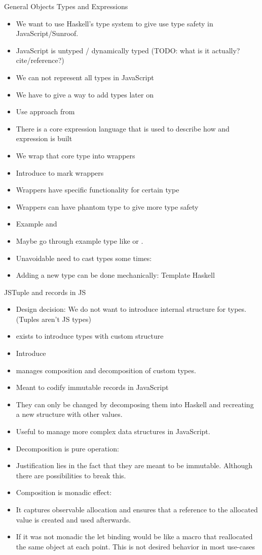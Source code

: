 General Objects Types and Expressions
\begin{itemize}
\item We want to use Haskell's type system to give use type safety in JavaScript/Sunroof.
\item JavaScript is untyped / dynamically typed (TODO: what is it actually? cite/reference?)
\item We can not represent all types in JavaScript
\item We have to give a way to add types later on
\item Use approach from \cite{Svenningsson:12:CombiningEmbedding}
\item There is a core expression language that is used to describe how and expression is built
\item We wrap that core type into wrappers
\item Introduce  to mark wrappers
\item Wrappers have specific functionality for certain type
\item Wrappers can have phantom type to give more type safety
\item Example  and 
\item Maybe go through example type like  or \Src{()}.
\item Unavoidable need to cast types some times: 
\item Adding a new type can be done mechanically: Template Haskell
\end{itemize}
JSTuple and records in JS
\begin{itemize}
\item Design decision: We do not want to introduce internal
structure for types. (Tuples aren't JS types)
\item {} exists to introduce types with custom structure
\item Introduce 
\item manages composition and decomposition of custom types.
\item Meant to codify immutable records in JavaScript
\item They can only be changed
by decomposing them into Haskell and recreating a new structure
with other values.
\item Useful to manage more complex data structures in JavaScript.
\item Decomposition is pure operation: 
\item Justification lies in the fact that they are meant to be 
immutable. Although there are possibilities to break this.
\item Composition is monadic effect: 
\item It captures observable allocation and ensures that a reference to the
allocated value is created and used afterwards.
\item If it was not monadic the let binding would be like a macro
that reallocated the same object at each point. This 
is not desired behavior in most use-cases
\end{itemize}
